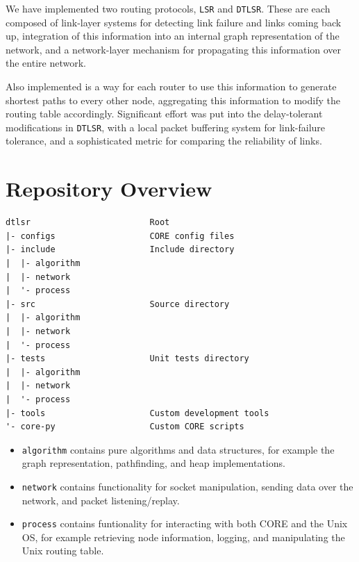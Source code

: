 \documentclass[withindex,glossary,openany]{cam-thesis}
\begin{document}
We have implemented two routing protocols, \texttt{LSR} and \texttt{DTLSR}. These are each composed of link-layer systems for detecting link failure and links coming back up, integration of this information into an internal graph representation of the network, and a network-layer mechanism for propagating this information over the entire network.

Also implemented is a way for each router to use this information to generate shortest paths to every other node, aggregating this information to modify the routing table accordingly. Significant effort was put into the delay-tolerant modifications in \texttt{DTLSR}, with a local packet buffering system for link-failure tolerance, and a sophisticated metric for comparing the reliability of links.

\section{Repository Overview}
\begin{minipage}{1\textwidth} \centering
\begin{lstlisting}[label=repository, frame=tb]
dtlsr                        Root
|- configs                   CORE config files
|- include                   Include directory
|  |- algorithm
|  |- network
|  '- process
|- src                       Source directory
|  |- algorithm
|  |- network
|  '- process
|- tests                     Unit tests directory
|  |- algorithm
|  |- network
|  '- process
|- tools                     Custom development tools
'- core-py                   Custom CORE scripts
\end{lstlisting}
\end{minipage}

\begin{itemize}
	\item
	\texttt{algorithm} contains pure algorithms and data structures, for example the graph representation, pathfinding, and heap implementations.

	\item
	\texttt{network} contains functionality for socket manipulation, sending data over the network, and packet listening/replay.
	
	\item
	\texttt{process} contains funtionality for interacting with both CORE and the Unix OS, for example retrieving node information, logging, and manipulating the Unix routing table.
\end{itemize}
\end{document}

